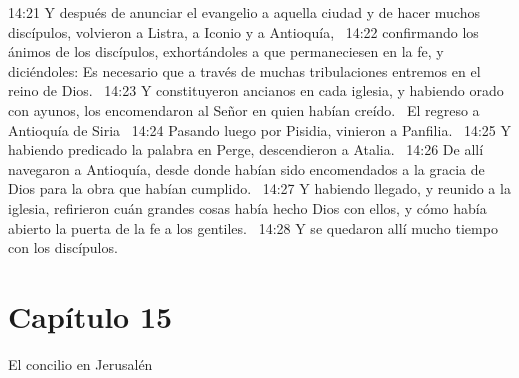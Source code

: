 14:21 Y después de anunciar el evangelio a aquella ciudad y de hacer muchos discípulos, volvieron a Listra, a Iconio y a Antioquía,  
14:22 confirmando los ánimos de los discípulos, exhortándoles a que permaneciesen en la fe, y diciéndoles: Es necesario que a través de muchas tribulaciones entremos en el reino de Dios.  
14:23 Y constituyeron ancianos en cada iglesia, y habiendo orado con ayunos, los encomendaron al Señor en quien habían creído.  
El regreso a Antioquía de Siria  
14:24 Pasando luego por Pisidia, vinieron a Panfilia.  
14:25 Y habiendo predicado la palabra en Perge, descendieron a Atalia.  
14:26 De allí navegaron a Antioquía, desde donde habían sido encomendados a la gracia de Dios para la obra que habían cumplido.  
14:27 Y habiendo llegado, y reunido a la iglesia, refirieron cuán grandes cosas había hecho Dios con ellos, y cómo había abierto la puerta de la fe a los gentiles.  
14:28 Y se quedaron allí mucho tiempo con los discípulos. 

\section*{Capítulo 15}
El concilio en Jerusalén  

